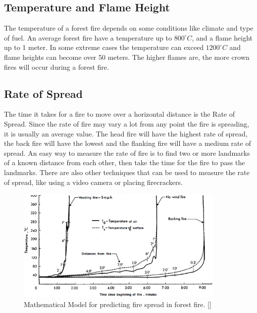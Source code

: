 \subsection{Temperature and Flame Height}
The temperature of a forest fire depends on some conditions like climate and type of fuel. An average forest fire have a temperature up to $800^{\circ}C$, and a flame height up to 1 meter. In some extreme cases the temperature can exceed $1200^{\circ}C$ and flame heights can become over 50 meters. The higher flames are, the more crown fires will occur during a forest fire. \cite{firebas}
\subsection{Rate of Spread}
The time it takes for a fire to move over a horizontal distance is the Rate of Spread. Since the rate of fire may vary a lot from any point the fire is spreading, it is usually an average value. The head fire will have the highest rate of spread, the back fire will have the lowest and the flanking fire will have a medium rate of spread. An easy way to measure the rate of fire is to find two or more landmarks of a known distance from each other, then take the time for the fire to pass the landmarks. There are also other techniques that can be used to measure the rate of spread, like using a video camera or placing firecrackers\cite{rateofspread}.
\begin{figure}[here]
  \centering
      \includegraphics[width=0.9\textwidth]{theory/graphics/fire-prediction.jpg}
  \caption{Mathematical Model for predicting fire spread in forest fire. [] }
  \label{fig:fire-prediction}
\end{figure}

